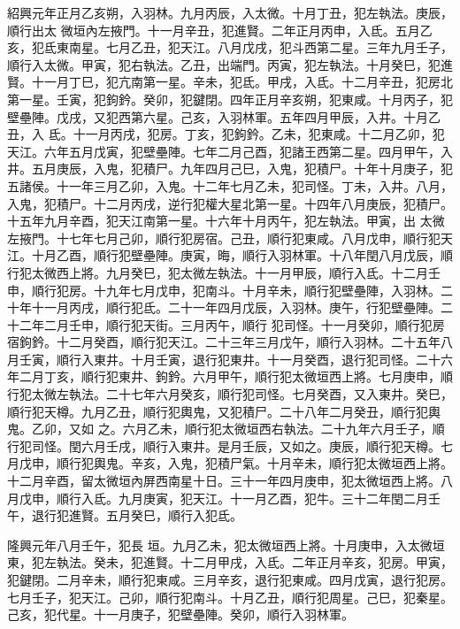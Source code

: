 \begin{pinyinscope}
 紹興元年正月乙亥朔，入羽林。九月丙辰，入太微。十月丁丑，犯左執法。庚辰，順行出太
 微垣內左掖門。十一月辛丑，犯進賢。二年正月丙申，入氐。五月乙亥，犯氐東南星。七月乙丑，犯天江。八月戊戌，犯斗西第二星。三年九月壬子，順行入太微。甲寅，犯右執法。乙丑，出端門。丙寅，犯左執法。十月癸巳，犯進賢。十一月丁巳，犯亢南第一星。辛未，犯氐。甲戌，入氐。十二月辛丑，犯房北第一星。壬寅，犯鉤鈐。癸卯，犯鍵閉。四年正月辛亥朔，犯東咸。十月丙子，犯壁壘陣。戊戌，又犯西第六星。己亥，入羽林軍。五年四月甲辰，入井。十月乙丑，入
 氐。十一月丙戌，犯房。丁亥，犯鉤鈐。乙未，犯東咸。十二月乙卯，犯天江。六年五月戊寅，犯壁壘陣。七年二月己酉，犯諸王西第二星。四月甲午，入井。五月庚辰，入鬼，犯積尸。九年四月己巳，入鬼，犯積尸。十年十月庚子，犯五諸侯。十一年三月乙卯，入鬼。十二年七月乙未，犯司怪。丁未，入井。八月，入鬼，犯積尸。十二月丙戌，逆行犯權大星北第一星。十四年八月庚辰，犯積尸。十五年九月辛酉，犯天江南第一星。十六年十月丙午，犯左執法。甲寅，出
 太微左掖門。十七年七月己卯，順行犯房宿。己丑，順行犯東咸。八月戊申，順行犯天江。十月乙酉，順行犯壁壘陣。庚寅，晦，順行入羽林軍。十八年閏八月戊辰，順行犯太微西上將。九月癸巳，犯太微左執法。十一月甲辰，順行入氐。十二月壬申，順行犯房。十九年七月戊申，犯南斗。十月辛未，順行犯壁壘陣，入羽林。二十年十一月丙戌，順行犯氐。二十一年四月戊辰，入羽林。庚午，行犯壁壘陣。二十二年二月壬申，順行犯天街。三月丙午，順行
 犯司怪。十一月癸卯，順行犯房宿鉤鈐。十二月癸酉，順行犯天江。二十三年三月戊午，順行入羽林。二十五年八月壬寅，順行入東井。十月壬寅，退行犯東井。十一月癸酉，退行犯司怪。二十六年二月丁亥，順行犯東井、鉤鈐。六月甲午，順行犯太微垣西上將。七月庚申，順行犯太微左執法。二十七年六月癸亥，順行犯司怪。七月癸酉，又入東井。癸巳，順行犯天樽。九月乙丑，順行犯輿鬼，又犯積尸。二十八年二月癸丑，順行犯輿鬼。乙卯，又如
 之。六月乙未，順行犯太微垣西右執法。二十九年六月壬子，順行犯司怪。閏六月壬戌，順行入東井。是月壬辰，又如之。庚辰，順行犯天樽。七月戊申，順行犯輿鬼。辛亥，入鬼，犯積尸氣。十月辛未，順行犯太微垣西上將。十二月辛酉，留太微垣內屏西南星十日。三十一年四月庚申，犯太微垣西上將。八月戊申，順行入氐。九月庚寅，犯天江。十一月乙酉，犯牛。三十二年閏二月壬午，退行犯進賢。五月癸巳，順行入犯氐。



 隆興元年八月壬午，犯長
 垣。九月乙未，犯太微垣西上將。十月庚申，入太微垣東，犯左執法。癸未，犯進賢。十二月甲戌，入氐。二年正月辛亥，犯房。甲寅，犯鍵閉。二月辛未，順行犯東咸。三月辛亥，退行犯東咸。四月戊寅，退行犯房。七月壬子，犯天江。己卯，順行犯南斗。十月乙丑，順行犯周星。己巳，犯秦星。己亥，犯代星。十一月庚子，犯壁壘陣。癸卯，順行入羽林軍。




\end{pinyinscope}
